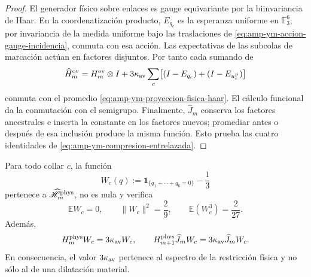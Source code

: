 \begin{proof}
El generador físico sobre enlaces es gauge equivariante por la
biinvariancia de Haar. En la coordenatización producto, \(E_{q_c}\) es la esperanza
uniforme en \(\mathbb F_3^6\); por invariancia de la medida uniforme bajo
las traslaciones de \eqref{eq:amp-ym-accion-gauge-incidencia}, conmuta con
esa acción. Las expectativas de las subcolas de marcación actúan en
factores disjuntos. Por tanto cada sumando de
\[
 \widehat H_m^{\rm ov}
 =H_m^{\rm ov}\otimes I
 +3\kappa_{\rm av}\sum_c
 \bigl[(I-E_{q_c})+(I-E_{u_c^{\rm P}})\bigr]
\]
conmuta con el promedio \eqref{eq:amp-ym-proyeccion-fisica-haar}. El
cálculo funcional da la conmutación con el semigrupo. Finalmente,
\(\widehat J_m\) conserva los factores ancestrales e inserta la constante
en los factores nuevos; promediar antes o después de esa inclusión produce
la misma función. Esto prueba las cuatro identidades de
\eqref{eq:amp-ym-compresion-entrelazada}.
\end{proof}

\begin{lemma}
\label{lem:amp-ym-testigo-fisico-q6}
Para todo collar \(c\), la función
\begin{equation}\label{eq:amp-ym-testigo-fisico-def}
 W_c(q)
 :=\mathbf 1_{\{q_1+\cdots+q_6=0\}}-\frac13
\end{equation}
pertenece a \(\widehat{\mathscr H}_m^{\rm phys}\), no es nula y verifica
\begin{equation}\label{eq:amp-ym-testigo-fisico-momentos}
 \mathbb E W_c=0,\qquad
 \|W_c\|^2=\frac29,\qquad
 \mathbb E(W_c^3)=\frac2{27}.
\end{equation}
Además,
\begin{equation}\label{eq:amp-ym-testigo-fisico-gap}
 H_m^{\rm phys}W_c=3\kappa_{\rm av}W_c,\qquad
 H_{m+1}^{\rm phys}\widehat J_mW_c
 =3\kappa_{\rm av}\widehat J_mW_c.
\end{equation}
En consecuencia, el valor \(3\kappa_{\rm av}\) pertenece al espectro de la
restricción física y no sólo al de una dilatación material.
\end{lemma}

